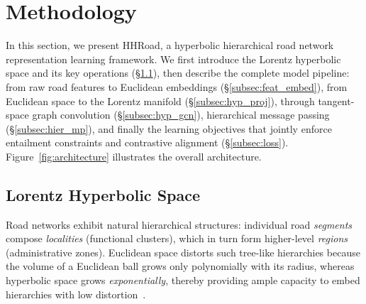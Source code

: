 
\section{Methodology}\label{sec:method}

In this section, we present HHRoad, a hyperbolic hierarchical road network representation learning framework.
We first introduce the Lorentz hyperbolic space and its key operations (\S\ref{subsec:prelim}),
then describe the complete model pipeline:
from raw road features to Euclidean embeddings (\S\ref{subsec:feat_embed}),
from Euclidean space to the Lorentz manifold (\S\ref{subsec:hyp_proj}),
through tangent-space graph convolution (\S\ref{subsec:hyp_gcn}),
hierarchical message passing (\S\ref{subsec:hier_mp}),
and finally the learning objectives that jointly enforce entailment constraints and contrastive alignment (\S\ref{subsec:loss}).
Figure~\ref{fig:architecture} illustrates the overall architecture.

\subsection{Lorentz Hyperbolic Space}\label{subsec:prelim}

Road networks exhibit natural hierarchical structures:
individual road \emph{segments} compose \emph{localities} (functional clusters),
which in turn form higher-level \emph{regions} (administrative zones).
Euclidean space distorts such tree-like hierarchies because the volume of a Euclidean ball grows only polynomially with its radius,
whereas hyperbolic space grows \emph{exponentially}, thereby providing ample capacity to embed hierarchies with low distortion~\cite{nickel2017poincare,ganea2018hyperbolic}.

